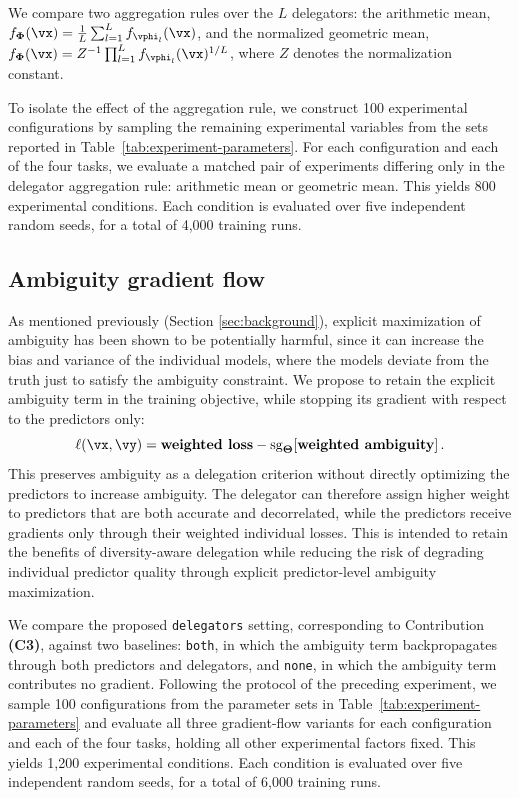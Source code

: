 \documentclass[10pt]{article} %
\def\vTheta{{\bm{\Theta}}}
\def\vPhi{{\bm{\Phi}}}
\begin{document}
We compare two aggregation rules over the $L$ delegators: the arithmetic mean, $f_{\vPhi}(\vx) = \frac{1}{L}\sum_{l=1}^{L} f_{\vphi_l}(\vx)$, and the normalized geometric mean, $f_{\vPhi}(\vx) = Z^{-1}\prod_{l=1}^{L} f_{\vphi_l}(\vx)^{1/L}$, where $Z$ denotes the normalization constant.

To isolate the effect of the aggregation rule, we construct 100 experimental configurations by sampling the remaining experimental variables from the sets reported in Table~\ref{tab:experiment-parameters}. For each configuration and each of the four tasks, we evaluate a matched pair of experiments differing only in the delegator aggregation rule: arithmetic mean or geometric mean. This yields 800 experimental conditions. Each condition is evaluated over five independent random seeds, for a total of 4,000 training runs.

\subsection{Ambiguity gradient flow} \label{sec:exp-gradient}

As mentioned previously (Section \ref{sec:background}), explicit maximization of ambiguity has been shown to be potentially harmful, since it can increase the bias and variance of the individual models, where the models deviate from the truth just to satisfy the ambiguity constraint. We propose to retain the explicit ambiguity term in the training objective, while stopping its gradient with respect to the predictors only:
\begin{equation} \label{eq:ens-loss}
\ell(\vx, \vy)
=
\textbf{weighted loss}
-
\operatorname{sg}_{\vTheta}
\!\left[
\textbf{weighted ambiguity}
\right].
\end{equation}
This preserves ambiguity as a delegation criterion without directly optimizing the predictors to increase ambiguity. The delegator can therefore assign higher weight to predictors that are both accurate and decorrelated, while the predictors receive gradients only through their weighted individual losses. This is intended to retain the benefits of diversity-aware delegation while reducing the risk of degrading individual predictor quality through explicit predictor-level ambiguity maximization.  

We compare the proposed \texttt{delegators} setting, corresponding to Contribution \textbf{(C3)}, against two baselines: \texttt{both}, in which the ambiguity term backpropagates through both predictors and delegators, and \texttt{none}, in which the ambiguity term contributes no gradient. Following the protocol of the preceding experiment, we sample 100 configurations from the parameter sets in Table~\ref{tab:experiment-parameters} and evaluate all three gradient-flow variants for each configuration and each of the four tasks, holding all other experimental factors fixed. This yields 1,200 experimental conditions. Each condition is evaluated over five independent random seeds, for a total of 6,000 training runs.
\end{document}
